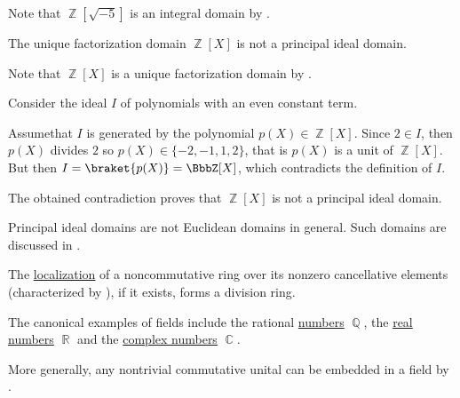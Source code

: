 \begin{example}
\begin{reflist}
    Note that \( \BbbZ[\sqrt{-5}] \) is an integral domain by .

    \cite{ProofWiki:polynomials_in_integers_is_not_principal_ideal_domain} The unique factorization domain \( \BbbZ[X] \) is not a principal ideal domain.

    Note that \( \BbbZ[X] \) is a unique factorization domain by .

    Consider the ideal \( I \) of polynomials with an even constant term.

    Assume\LEM that \( I \) is generated by the polynomial \( p(X) \in \BbbZ[X] \). Since \( 2 \in I \), then \( p(X) \) divides \( 2 \) so \( p(X) \in \{ -2, -1, 1, 2 \} \), that is \( p(X) \) is a unit of \( \BbbZ[X] \). But then \( I = \braket{p(X)} = \BbbZ[X] \), which contradicts the definition of \( I \).

    The obtained contradiction proves that \( \BbbZ[X] \) is not a principal ideal domain.

     Principal ideal domains are not Euclidean domains in general. Such domains are discussed in \cite{Anderson1988}.

     The \hyperref[def:ring_localization]{localization} of a noncommutative ring over its nonzero cancellative elements (characterized by ), if it exists, forms a division ring.

     The canonical examples of fields include the rational \hyperref[def:rational_numbers]{numbers} \( \BbbQ \), the \hyperref[def:real_numbers]{real numbers} \( \BbbR \) and the \hyperref[def:complex_numbers]{complex numbers} \( \BbbC \).

    More generally, any nontrivial commutative unital can be embedded in a field by .
  \end{reflist}
\end{example}

